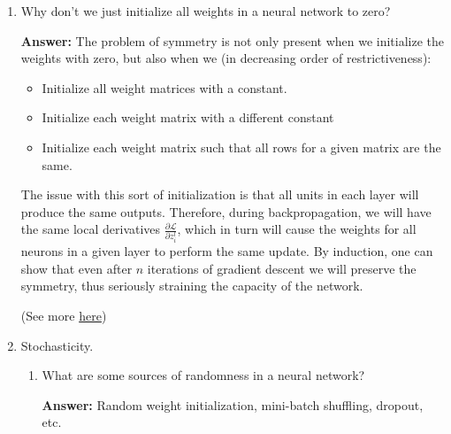 \documentclass{article}
\newenvironment{QandA}{\begin{enumerate}[label=\arabic*.]}{\end{enumerate}}
\newenvironment{InnerQandA}{\begin{enumerate}[label=\roman*.]}{\end{enumerate}}
\newenvironment{answer}{\par\normalfont \textbf{Answer:}}{}
\begin{document}
\begin{QandA}
    \item Why don’t we just initialize all weights in a neural network to zero?
    \begin{answer}
        The problem of symmetry is not only present when we initialize the weights with zero, but also when we (in decreasing order of restrictiveness):
        \begin{itemize}
            \item Initialize all weight matrices with a constant.
            \item Initialize each weight matrix with a different constant
            \item Initialize each weight matrix such that all rows for a given matrix are the same. 
        \end{itemize}
        The issue with this sort of initialization is that all units in each layer will produce the same outputs. Therefore, during backpropagation, we will have the same local derivatives $\frac{\partial \mathcal{L}}{\partial z^{l}_i}$, which in turn will cause the weights for all neurons in a given layer to perform the same update. By induction, one can show that even after $n$ iterations of gradient descent we will preserve the symmetry, thus seriously straining the capacity of the network. 

        (See more \href{https://www.coursera.org/lecture/neural-networks-deep-learning/www.deeplearning.ai-XtFPI}{here})
    \end{answer}

    \item Stochasticity.
    \begin{InnerQandA}
        \item What are some sources of randomness in a neural network?
        \begin{answer}
            Random weight initialization, mini-batch shuffling, dropout, etc.
        \end{answer}


\end{InnerQandA}
\end{QandA}
\end{document}
